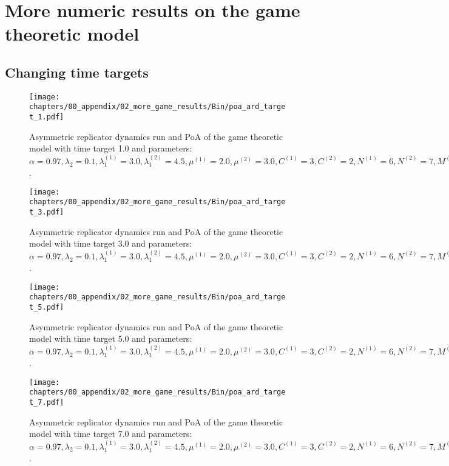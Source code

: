 \chapter{More numeric results on the game theoretic model}
\label{appendix:game_theoretic_model}

\section{Changing time targets}

\begin{figure}[H]
    \texttt{[image: chapters/00\_appendix/02\_more\_game\_results/Bin/poa\_ard\_target\_1.pdf]}
    \caption{Asymmetric replicator dynamics run and PoA of the game theoretic
    model with time target 1.0 and parameters: \(\alpha = 0.97,
    \lambda_2 = 0.1, \lambda_1^{(1)} = 3.0, \lambda_1^{(2)} = 4.5,
    \mu^{(1)} = 2.0, \mu^{(2)} = 3.0, C^{(1)} = 3, C^{(2)} = 2,
    N^{(1)} = 6, N^{(2)} = 7, M^{(1)} = 5, M^{(2)} = 4\).}
    \label{fig:poa_ard_target_1}
\end{figure}


\begin{figure}[H]
    \texttt{[image: chapters/00\_appendix/02\_more\_game\_results/Bin/poa\_ard\_target\_3.pdf]}
    \caption{Asymmetric replicator dynamics run and PoA of the game theoretic
    model with time target 3.0 and parameters: \(\alpha = 0.97,
    \lambda_2 = 0.1, \lambda_1^{(1)} = 3.0, \lambda_1^{(2)} = 4.5,
    \mu^{(1)} = 2.0, \mu^{(2)} = 3.0, C^{(1)} = 3, C^{(2)} = 2,
    N^{(1)} = 6, N^{(2)} = 7, M^{(1)} = 5, M^{(2)} = 4\).}
    \label{fig:poa_ard_target_3}
\end{figure}

\begin{figure}[H]
    \texttt{[image: chapters/00\_appendix/02\_more\_game\_results/Bin/poa\_ard\_target\_5.pdf]}
    \caption{Asymmetric replicator dynamics run and PoA of the game theoretic
    model with time target 5.0 and parameters: \(\alpha = 0.97,
    \lambda_2 = 0.1, \lambda_1^{(1)} = 3.0, \lambda_1^{(2)} = 4.5,
    \mu^{(1)} = 2.0, \mu^{(2)} = 3.0, C^{(1)} = 3, C^{(2)} = 2,
    N^{(1)} = 6, N^{(2)} = 7, M^{(1)} = 5, M^{(2)} = 4\).}
    \label{fig:poa_ard_target_5}
\end{figure}


\begin{figure}[H]
    \texttt{[image: chapters/00\_appendix/02\_more\_game\_results/Bin/poa\_ard\_target\_7.pdf]}
    \caption{Asymmetric replicator dynamics run and PoA of the game theoretic
    model with time target 7.0 and parameters: \(\alpha = 0.97,
    \lambda_2 = 0.1, \lambda_1^{(1)} = 3.0, \lambda_1^{(2)} = 4.5,
    \mu^{(1)} = 2.0, \mu^{(2)} = 3.0, C^{(1)} = 3, C^{(2)} = 2,
    N^{(1)} = 6, N^{(2)} = 7, M^{(1)} = 5, M^{(2)} = 4\).}
    \label{fig:poa_ard_target_7}
\end{figure}


